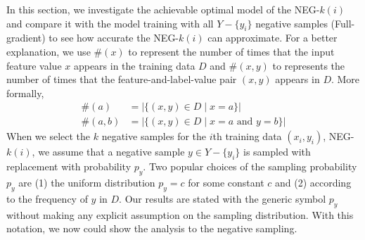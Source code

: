 In this section, we investigate the achievable optimal model of the NEG-$k(i)$ and compare it with the model training with all $Y - \{y_i\}$ negative samples (Full-gradient) to see how accurate the NEG-$k(i)$ can approximate. For a better explanation, we use $\#(x)$ to represent the number of times that the input feature value $x$ appears in the training data $D$ and $\#(x,y)$ to represents the number of times that the feature-and-label-value pair $(x,y)$ appears in $D$. More formally,
\small
\begin{align*}
\#(a)   &= \big\vert \{(x, y) \in D \mid x = a \}\big\vert \\
\#(a,b) &= \big\vert \{(x, y) \in D \mid x = a \text{ and } y = b\}\big\vert
\end{align*}
\normalsize
When we select the $k$ negative samples for the $i$th training data $(x_i, y_i)$, NEG-$k(i)$, we assume that a negative sample $y \in Y - \{y_i\}$ is sampled with replacement with probability $p_{y}$. Two popular choices of the sampling probability $p_{y}$ are (1) the uniform distribution $p_{y} = c$ for some constant $c$ and (2) according to the frequency of $y$ in $D$. Our results are stated with the generic symbol $p_y$ without making any explicit assumption on the sampling distribution. With this notation, we now could show the analysis to the negative sampling.
